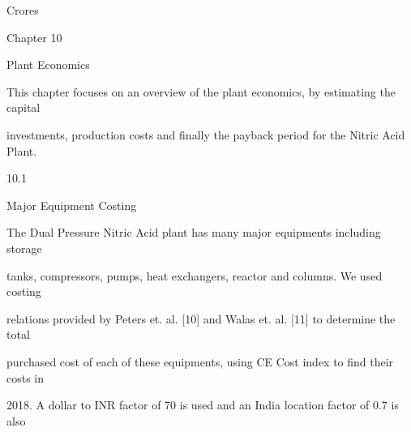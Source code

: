 \documentclass[a4paper,portrait,12pt]{article}
\begin{document}
\begin{flushleft}
Crores
\end{flushleft}





\begin{flushleft}
\newpage
Chapter 10
\end{flushleft}





\begin{flushleft}
Plant Economics
\end{flushleft}


\begin{flushleft}
This chapter focuses on an overview of the plant economics, by estimating the capital
\end{flushleft}


\begin{flushleft}
investments, production costs and finally the payback period for the Nitric Acid Plant.
\end{flushleft}





10.1





\begin{flushleft}
Major Equipment Costing
\end{flushleft}





\begin{flushleft}
The Dual Pressure Nitric Acid plant has many major equipments including storage
\end{flushleft}


\begin{flushleft}
tanks, compressors, pumps, heat exchangers, reactor and columns. We used costing
\end{flushleft}


\begin{flushleft}
relations provided by Peters et. al. [10] and Walas et. al. [11] to determine the total
\end{flushleft}


\begin{flushleft}
purchased cost of each of these equipments, using CE Cost index to find their costs in
\end{flushleft}


\begin{flushleft}
2018. A dollar to INR factor of 70 is used and an India location factor of 0.7 is also
\end{flushleft}
\end{document}

